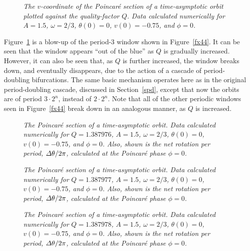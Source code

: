 \begin{figure}
\centerline{}
\caption{\em The $v$-coordinate of the Poincar\'{e} section of a time-asymptotic orbit
plotted against the quality-factor $Q$. Data
 calculated numerically for
$A=1.5$, $\omega=2/3$, $\theta(0)=0$, $v(0)=-0.75$, and $\phi=0$.}\label{f45}
\end{figure}

Figure~\ref{f45} is a blow-up of the period-3 window shown in Figure~\ref{fx44}. It can be
seen that the window appears ``out of the blue'' as $Q$ is gradually increased. However,
it can also be seen that, as $Q$ is further increased,  the window breaks down,
and eventually disappears, due to the action of a cascade of period-doubling
bifurcations. The same basic mechanism operates here as in the original period-doubling
cascade, discussed in Section~\ref{spd}, except that now the orbits are of period $3\cdot 2^n$, instead of $2\cdot 2^n$. 
Note that all of the other periodic windows seen in Figure~\ref{fx44} break down in an analogous manner,
as $Q$ is increased.


\begin{figure}
\centerline{}
\caption{\em The Poincar\'{e} section of a time-asymptotic orbit. Data
calculated numerically for $Q=1.387976$, $A=1.5$, $\omega=2/3$,
$\theta(0)=0$, $v(0)=-0.75$, and $\phi=0$. Also, shown is the
net rotation per period, ${\mit\Delta}\theta/2\pi$, calculated at the Poincar\'{e} phase
$\phi=0$.}\label{f46}
\end{figure}

\begin{figure}
\centerline{}
\caption{\em The Poincar\'{e} section of a time-asymptotic orbit. Data
calculated numerically for $Q=1.387977$, $A=1.5$, $\omega=2/3$,
$\theta(0)=0$, $v(0)=-0.75$, and $\phi=0$. Also, shown is the
net rotation per period, ${\mit\Delta}\theta/2\pi$, calculated at the Poincar\'{e} phase
$\phi=0$.}\label{f47}
\end{figure}

\begin{figure}
\centerline{}
\caption{\em The Poincar\'{e} section of a time-asymptotic orbit. Data
calculated numerically for $Q=1.387978$, $A=1.5$, $\omega=2/3$,
$\theta(0)=0$, $v(0)=-0.75$, and $\phi=0$. Also, shown is the
net rotation per period, ${\mit\Delta}\theta/2\pi$, calculated at the Poincar\'{e} phase
$\phi=0$.}\label{f48}
\end{figure}

